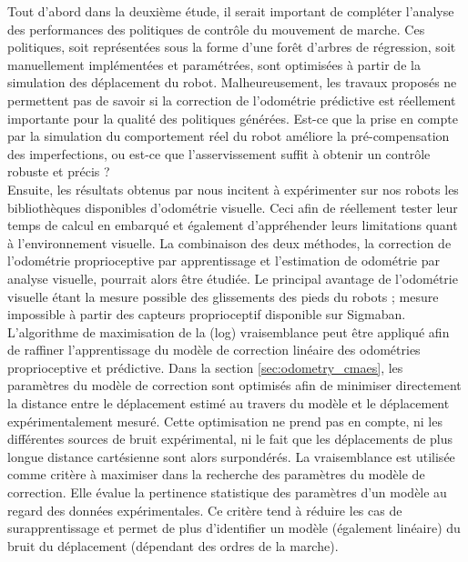 Tout d'abord dans la deuxième étude, il serait important de compléter 
l'analyse des performances des politiques de contrôle du mouvement de marche.
Ces politiques, soit représentées sous la forme d'une forêt d'arbres de régression,
soit manuellement implémentées et paramétrées, sont optimisées à partir 
de la simulation des déplacement du robot.
Malheureusement, les travaux proposés ne permettent pas de savoir si
la correction de l'odométrie prédictive est réellement importante
pour la qualité des politiques générées.
Est-ce que la prise en compte par la simulation du comportement réel du robot
améliore la pré-compensation des imperfections, 
ou est-ce que l'asservissement suffit à obtenir un contrôle robuste et précis ?\\

Ensuite, les résultats obtenus par \cite{oriolo_humanoid_2016} nous incitent
à expérimenter sur nos robots les bibliothèques disponibles d'odométrie visuelle.
Ceci afin de réellement tester leur temps de calcul en embarqué et également
d'appréhender leurs limitations quant à l'environnement visuelle.
La combinaison des deux méthodes, la correction de l'odométrie proprioceptive
par apprentissage et l'estimation de odométrie par analyse visuelle, 
pourrait alors être étudiée.
Le principal avantage de l'odométrie visuelle étant la mesure possible 
des glissements des pieds du robots ; mesure impossible à partir 
des capteurs proprioceptif disponible sur Sigmaban.\\

L'algorithme de maximisation de la (log) vraisemblance peut être
appliqué afin de raffiner l'apprentissage du modèle de correction 
linéaire des odométries proprioceptive et prédictive.
Dans la section \ref{sec:odometry_cmaes}, les paramètres du modèle de correction
sont optimisés afin de minimiser directement la distance entre le déplacement 
estimé au travers du modèle et le déplacement expérimentalement mesuré.
Cette optimisation ne prend pas en compte, ni les différentes sources
de bruit expérimental, ni le fait que les déplacements de plus
longue distance cartésienne sont alors surpondérés.
La vraisemblance est utilisée comme critère à maximiser dans 
la recherche des paramètres du modèle de correction.
Elle évalue la pertinence statistique des paramètres
d'un modèle au regard des données expérimentales.
Ce critère tend à réduire les cas de surapprentissage et
permet de plus d'identifier un modèle (également linéaire) du bruit
du déplacement (dépendant des ordres de la marche).

